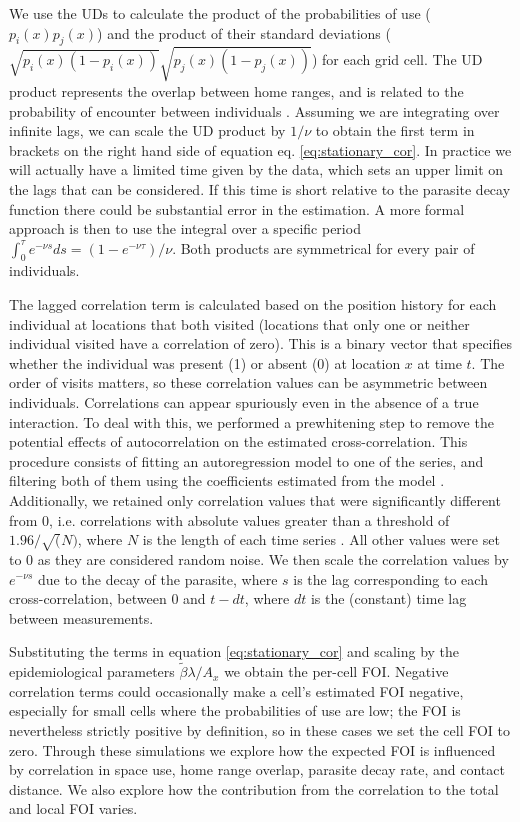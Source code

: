 \documentclass[letterpaper]{article}
\begin{document}
We use the UDs to calculate the product of the probabilities of use ($p_i(x)p_j(x)$) and the product of their standard deviations ($\sqrt{p_i(x)(1-p_i(x))}\sqrt{p_j(x)(1-p_j(x))}$) for each grid cell.
The UD product represents the overlap between home ranges, and is related to the probability of encounter between individuals \citep{Noonan2021}. Assuming we are integrating over infinite lags, we can scale the UD product by $1/\nu$ to obtain the first term in brackets on the right hand side of equation eq. \ref{eq:stationary_cor}. In practice we will actually have a limited time given by the data, which sets an upper limit on the lags that can be considered. If this time is short relative to the parasite decay function there could be substantial error in the estimation. A more formal approach is then to use the integral over a specific period  $\int_0^{\tau} e^{-\nu s}ds=(1-e^{-\nu\tau})/\nu$.
 Both products are symmetrical for every pair of individuals. 

The lagged correlation term is calculated based on the position history for each individual at locations that both visited (locations that only one or neither individual visited have a correlation of zero). This is a binary vector that specifies whether the individual was present (1) or absent (0) at location $x$ at time $t$. 
The order of visits matters, so these correlation values can be asymmetric between individuals. 
Correlations can appear spuriously even in the absence of a true interaction. To deal with this, we performed a prewhitening step to remove the potential effects of autocorrelation on the estimated cross-correlation. This procedure consists of fitting an autoregression model to one of the series, and filtering both of them using the coefficients estimated from the model \citep{Dean2016}. Additionally, we retained only correlation values that were significantly different from 0, i.e. correlations with absolute values greater than a threshold of $1.96/\sqrt(N)$, where $N$ is the length of each time series \citep{Dean2016}. All other values were set to 0 as they are considered random noise.
We then scale the correlation values by $e^{-\nu s}$ due to the decay of the parasite, where $s$ is the lag corresponding to each cross-correlation, between 0 and $t-dt$, where $dt$ is the (constant) time lag between measurements. 

Substituting the terms in equation \ref{eq:stationary_cor} and scaling by the epidemiological parameters $\tilde\beta\lambda/ A_x$ we obtain the per-cell FOI. Negative correlation terms could occasionally make a cell's estimated FOI negative, especially for small cells where the probabilities of use are low; the FOI is nevertheless strictly positive by definition, so in these cases we set the cell FOI to zero.
Through these simulations we explore how the expected FOI is influenced by correlation in space use, home range overlap, parasite decay rate, and contact distance. We also explore how the contribution from the correlation to the total and local FOI varies. 
\end{document}

